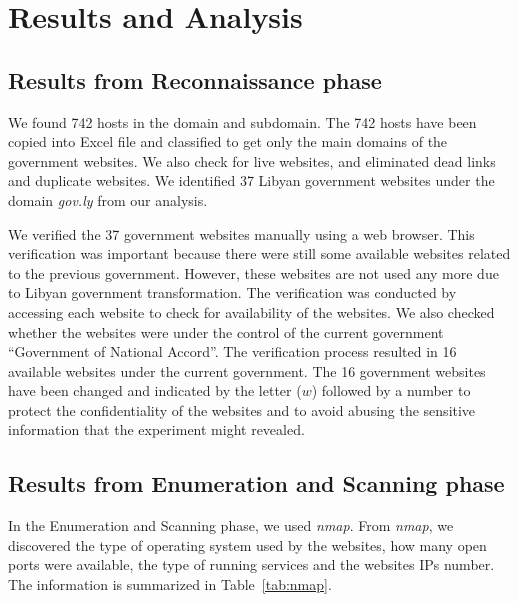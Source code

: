 \documentclass[conference]{IEEEtran}
\begin{document}
\section{Results and Analysis}


\subsection{Results from Reconnaissance phase}


We found 742 hosts in the domain and subdomain. The 742 hosts have
been copied into Excel file and classified to get only the main
domains of the government websites. We also check for live websites,
and eliminated dead links and duplicate websites. We identified 37
Libyan government websites under the domain \emph{gov.ly} from our
analysis.

We verified the 37 government websites manually using a web
browser. This verification was important because there were still some
available websites related to the previous government. However, these
websites are not used any more due to Libyan government
transformation.  The verification was conducted by accessing each
website to check for availability of the websites. We also checked
whether the websites were under the control of the current government
``Government of National Accord''. The verification process resulted
in 16 available websites under the current government. The 16
government websites have been changed and indicated by the letter
($w$) followed by a number to protect the confidentiality of the
websites and to avoid abusing the sensitive information that the
experiment might revealed.

\subsection{Results from Enumeration and Scanning phase}


In the Enumeration and Scanning phase, we used \emph{nmap}. From
\emph{nmap}, we discovered the type of operating system used by the
websites, how many open ports were available, the type of running
services and the websites IPs number. The information is summarized in
Table~\ref{tab:nmap}.
\end{document}
